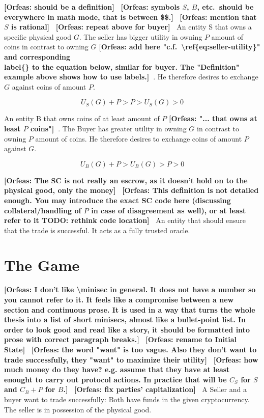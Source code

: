 \documentclass{cacthesis}
\newcommand{\authnote}[3]{{ \footnotesize \textbf{#1[#2: #3]~}}}
\newcommand{\orfnote}[1]{\authnote{\color{blue}}{Orfeas}{#1}}
\begin{document}
\orfnote{should be a definition}
\orfnote{symbols $S$, $B$, etc.\ should be everywhere in math mode, that is
between \$\$.}
\orfnote{mention that $S$ is rational}
\orfnote{repeat above for buyer}
An entity S that owns a specific physical good $G$. The seller
has bigger utility in owning $P$ amount of coins in contrast to owning $G$
\orfnote{add here "c.f.~\textbackslash{}ref\{eq:seller-utility\}" and
corresponding \\label\{\} to the equation below, similar for buyer. The
"Definition" example above shows how to use labels.}. He therefore desires to
exchange $G$ against coins of amount $P$.

\begin{equation}
    U_S(G) + P > P > U_S(G) > 0
\end{equation}

An entity B that owns coins of at least amount of $P$
\orfnote{"... that owns at least $P$ coins"}. The Buyer has greater utility in owning $G$ in contrast to  owning $P$ amount of coins. He therefore desires to exchange coins of amount $P$ against $G$.

\begin{equation}
    U_B(G) + P > U_B(G) > P > 0
\end{equation}

\orfnote{The SC is not really an escrow, as it doesn't hold on to the physical
good, only the money}
\orfnote{This definition is not detailed enough. You may introduce the exact
SC code here (discussing collateral/handling of $P$ in case of
disagreement as well), or at least refer to it TODO: rethink code location}
 An entity that should ensure that the trade is successful. It acts as a fully trusted oracle.

\section{The Game}
\orfnote{I don't like \textbackslash{}minisec in general. It does not have a
number so you cannot refer to it. It feels like a compromise between a new
section and continuous prose. It is used in a way that turns the whole thesis
into a list of short minisecs, almost like a bullet-point list. In order to look
good and read like a story, it should be formatted into prose with correct
paragraph breaks.}
 \orfnote{rename to Initial State}
\orfnote{the word "want" is too vague. Also they don't want to trade
successfully, they "want" to maximize their utility}
\orfnote{how much money do they have? e.g. assume that they have at least
enought to carry out protocol actions. In practice that will be $C_S$ for $S$
and $C_B + P$ for $B$.}
\orfnote{fix parties' capitalization}
A Seller and a buyer want to trade successfully: Both have funds in the given cryptocurrency. The seller is in possession of the physical good.
\end{document}
